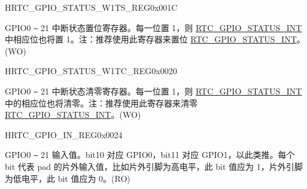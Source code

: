 \begin{register}{H}{RTC\_GPIO\_STATUS\_W1TS\_REG}{0x{}001C}\label{regdesc:RTCIORTCGPIOSTATUSW1TSREG}
%
%
\regnewline%
\begin{regdesc}\begin{reglist}
\label{fielddesc:RTCIOGPIOSTATUSINTW1TS}\item [RTC\_GPIO\_STATUS\_INT\_W1TS] GPIO0 \verb+~+ 21 中断状态置位寄存器。每一位置 1，则 \hyperref[fielddesc:RTCIOGPIOSTATUSINT]{RTC\_GPIO\_STATUS\_INT} 中相应位也将置 1。注：推荐使用此寄存器来置位 \hyperref[fielddesc:RTCIOGPIOSTATUSINT]{RTC\_GPIO\_STATUS\_INT}。(WO)
\end{reglist}\end{regdesc}
\end{register}


\begin{register}{H}{RTC\_GPIO\_STATUS\_W1TC\_REG}{0x{}0020}\label{regdesc:RTCIORTCGPIOSTATUSW1TCREG}
%
%
\regnewline%
\begin{regdesc}\begin{reglist}
\label{fielddesc:RTCIOGPIOSTATUSINTW1TC}\item [RTC\_GPIO\_STATUS\_INT\_W1TC] GPIO0 \verb+~+ 21 中断状态清零寄存器。每一位置 1，则 \hyperref[fielddesc:RTCIOGPIOSTATUSINT]{RTC\_GPIO\_STATUS\_INT} 中的相应位也将清零。注：推荐使用此寄存器来清零 \hyperref[fielddesc:RTCIOGPIOSTATUSINT]{RTC\_GPIO\_STATUS\_INT}。(WO)
\end{reglist}\end{regdesc}
\end{register}


\begin{register}{H}{RTC\_GPIO\_IN\_REG}{0x{}0024}\label{regdesc:RTCIORTCGPIOINREG}
%
%
\regnewline%
\begin{regdesc}\begin{reglist}
\label{fielddesc:RTCIOGPIOINNEXT}\item [RTC\_GPIO\_IN\_NEXT] GPIO0 \verb+~+ 21 输入值。bit10 对应 GPIO0，bit11 对应 GPIO1，以此类推。每个 bit 代表 pad 的片外输入值，比如片外引脚为高电平，此 bit 值应为 1，片外引脚为低电平，此 bit 值应为 0。(RO)
\end{reglist}\end{regdesc}
\end{register}


